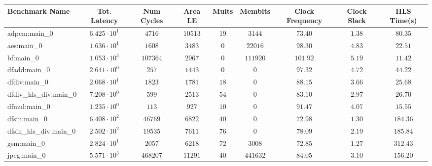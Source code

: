 \begin{tabular}{|l|c|c|c|c|c|c|c|c|}
\hline
Benchmark Name          & Tot. Latency           & Num Cycles & Area LE   & Mults   & Membits    & Clock Frequency & Clock Slack & HLS Time(s) \\
\hline
adpcm:main\_0           & $ 6.425 \cdot 10^{1} $ & $ 4716   $ & $ 10513 $ & $ 19  $ & $ 3144   $ & $ 73.40       $ & $ 1.38    $ & $ 80.35   $ \\
aes:main\_0             & $ 1.636 \cdot 10^{1} $ & $ 1608   $ & $ 3483  $ & $ 0   $ & $ 22016  $ & $ 98.30       $ & $ 4.83    $ & $ 22.51   $ \\
bf:main\_0              & $ 1.053 \cdot 10^{3} $ & $ 107364 $ & $ 2967  $ & $ 0   $ & $ 111920 $ & $ 101.92      $ & $ 5.19    $ & $ 11.42   $ \\
dfadd:main\_0           & $ 2.641 \cdot 10^{0} $ & $ 257    $ & $ 1443  $ & $ 0   $ & $ 0      $ & $ 97.32       $ & $ 4.72    $ & $ 44.22   $ \\
dfdiv:main\_0           & $ 2.068 \cdot 10^{1} $ & $ 1823   $ & $ 1781  $ & $ 18  $ & $ 0      $ & $ 88.15       $ & $ 3.66    $ & $ 25.68   $ \\
dfdiv\_hls\_div:main\_0 & $ 7.208 \cdot 10^{0} $ & $ 599    $ & $ 2513  $ & $ 54  $ & $ 0      $ & $ 83.10       $ & $ 2.97    $ & $ 26.70   $ \\
dfmul:main\_0           & $ 1.235 \cdot 10^{0} $ & $ 113    $ & $ 927   $ & $ 10  $ & $ 0      $ & $ 91.47       $ & $ 4.07    $ & $ 15.55   $ \\
dfsin:main\_0           & $ 6.408 \cdot 10^{2} $ & $ 46769  $ & $ 6822  $ & $ 40  $ & $ 0      $ & $ 72.98       $ & $ 1.30    $ & $ 184.36  $ \\
dfsin\_hls\_div:main\_0 & $ 2.502 \cdot 10^{2} $ & $ 19535  $ & $ 7611  $ & $ 76  $ & $ 0      $ & $ 78.09       $ & $ 2.19    $ & $ 185.84  $ \\
gsm:main\_0             & $ 2.824 \cdot 10^{1} $ & $ 2057   $ & $ 6218  $ & $ 72  $ & $ 3008   $ & $ 72.85       $ & $ 1.27    $ & $ 312.43  $ \\
jpeg:main\_0            & $ 5.571 \cdot 10^{3} $ & $ 468207 $ & $ 11291 $ & $ 40  $ & $ 441632 $ & $ 84.05       $ & $ 3.10    $ & $ 156.20  $ \\

\end{tabular}
